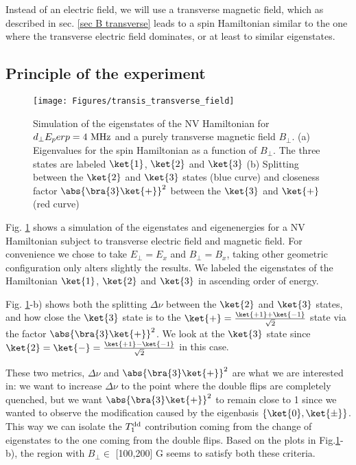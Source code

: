 \documentclass[a4paper,11pt]{report}
\begin{document}
Instead of an electric field, we will use a transverse magnetic field, which as described in sec. \ref{sec B transverse} leads to a spin Hamiltonian similar to the one where the transverse electric field dominates, or at least to similar eigenstates.
\subsection{Principle of the experiment}
\begin{figure}[h]
\centering
\texttt{[image: Figures/transis\_transverse\_field]}
\caption{Simulation of the eigenstates of the NV Hamiltonian for $d_\perp E_perp=4\ \rm MHz$ and a purely transverse magnetic field $B_\perp$. (a) Eigenvalues for the spin Hamiltonian as a function of $B_\perp$. The three states are labeled $\ket{1}$, $\ket{2}$ and $\ket{3}$ (b) Splitting between the $\ket{2}$ and $\ket{3}$ states (blue curve) and closeness factor $\abs{\bra{3}\ket{+}}^2$ between the $\ket{3}$ and $\ket{+}$ (red curve)}
\label{eigenstates transverse field}
\end{figure}

Fig. \ref{eigenstates transverse field} shows a simulation of the eigenstates and eigenenergies for a NV Hamiltonian subject to transverse electric field and magnetic field. For convenience we chose to take $E_\perp = E_x$ and $B_\perp = B_x$, taking other geometric configuration only alters slightly the results. We labeled the eigenstates of the Hamiltonian $\ket{1}$, $\ket{2}$ and $\ket{3}$ in ascending order of energy.

Fig. \ref{eigenstates transverse field}-b) shows both the splitting $\Delta \nu$ between the $\ket{2}$ and $\ket{3}$ states, and how close the $\ket{3}$ state is to the $\ket{+}=\frac{\ket{+1}+\ket{-1}}{\sqrt{2}}$ state via the factor $\abs{\bra{3}\ket{+}}^2$. We look at the $\ket{3}$ state since $\ket{2}=\ket{-}=\frac{\ket{+1}-\ket{-1}}{\sqrt{2}}$ in this case.

These two metrics, $\Delta \nu$ and $\abs{\bra{3}\ket{+}}^2$ are what we are interested in: we want to increase $\Delta \nu$ to the point where the double flips are completely quenched, but we want $\abs{\bra{3}\ket{+}}^2$ to remain close to 1 since we wanted to observe the modification caused by the eigenbasis $\{\ket{0},\ket{\pm}\}$. This way we can isolate the $T_1^{\rm dd}$ contribution coming from the change of eigenstates to the one coming from the double flips. Based on the plots in Fig.\ref{eigenstates transverse field}-b), the region with $B_\perp \in$ [100,200] G seems to satisfy both these criteria.
\end{document}
